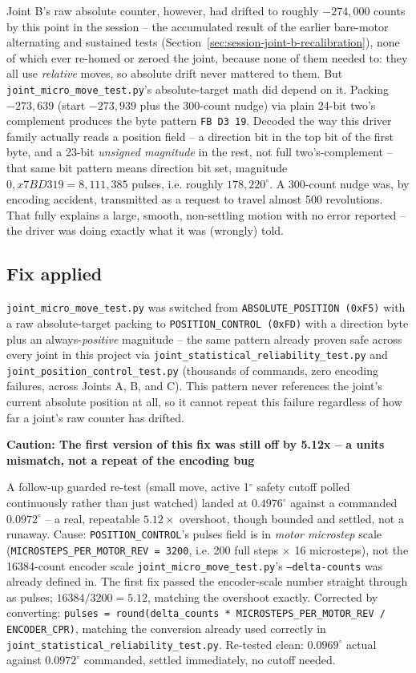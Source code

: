 \documentclass[11pt,letterpaper]{article}
\newenvironment{caution}[1]{%
    \par\addvspace{8pt}%
    \noindent{\color{cautionred}\rule{\linewidth}{0.8pt}}\par\vspace{2pt}
    \noindent\textbf{\color{cautionred}Caution: #1}\par\vspace{2pt}
}{%
    \par\vspace{2pt}\noindent{\color{cautionred}\rule{\linewidth}{0.4pt}}%
    \par\addvspace{8pt}%
}
\begin{document}
Joint B's raw absolute counter, however, had drifted to roughly $-274{,}000$ counts by this point in the session -- the accumulated result of the earlier bare-motor alternating and sustained tests (Section~\ref{sec:session-joint-b-recalibration}), none of which ever re-homed or zeroed the joint, because none of them needed to: they all use \emph{relative} moves, so absolute drift never mattered to them. But \texttt{joint\_micro\_move\_test.py}'s absolute-target math did depend on it. Packing $-273{,}639$ (start $-273{,}939$ plus the 300-count nudge) via plain 24-bit two's complement produces the byte pattern \texttt{FB D3 19}. Decoded the way this driver family actually reads a position field -- a direction bit in the top bit of the first byte, and a 23-bit \emph{unsigned magnitude} in the rest, not full two's-complement -- that same bit pattern means direction bit set, magnitude $0{,}x7BD319 = 8{,}111{,}385$ pulses, i.e. roughly $178{,}220^\circ$. A 300-count nudge was, by encoding accident, transmitted as a request to travel almost 500 revolutions. That fully explains a large, smooth, non-settling motion with no error reported -- the driver was doing exactly what it was (wrongly) told.

\subsection{Fix applied}
\texttt{joint\_micro\_move\_test.py} was switched from \texttt{ABSOLUTE\_POSITION (0xF5)} with a raw absolute-target packing to \texttt{POSITION\_CONTROL (0xFD)} with a direction byte plus an always-\emph{positive} magnitude -- the same pattern already proven safe across every joint in this project via \texttt{joint\_statistical\_reliability\_test.py} and \texttt{joint\_position\_control\_test.py} (thousands of commands, zero encoding failures, across Joints A, B, and C). This pattern never references the joint's current absolute position at all, so it cannot repeat this failure regardless of how far a joint's raw counter has drifted.

\begin{caution}{The first version of this fix was still off by 5.12x -- a units mismatch, not a repeat of the encoding bug}
A follow-up guarded re-test (small move, active 1$^\circ$ safety cutoff polled continuously rather than just watched) landed at $0.4976^\circ$ against a commanded $0.0972^\circ$ -- a real, repeatable $5.12\times$ overshoot, though bounded and settled, not a runaway. Cause: \texttt{POSITION\_CONTROL}'s pulses field is in \emph{motor microstep} scale (\texttt{MICROSTEPS\_PER\_MOTOR\_REV = 3200}, i.e. 200 full steps $\times$ 16 microsteps), not the 16384-count encoder scale \texttt{joint\_micro\_move\_test.py}'s \texttt{--delta-counts} was already defined in. The first fix passed the encoder-scale number straight through as pulses; $16384 / 3200 = 5.12$, matching the overshoot exactly. Corrected by converting: \texttt{pulses = round(delta\_counts * MICROSTEPS\_PER\_MOTOR\_REV / ENCODER\_CPR)}, matching the conversion already used correctly in \texttt{joint\_statistical\_reliability\_test.py}. Re-tested clean: $0.0969^\circ$ actual against $0.0972^\circ$ commanded, settled immediately, no cutoff needed.
\end{caution}
\end{document}
